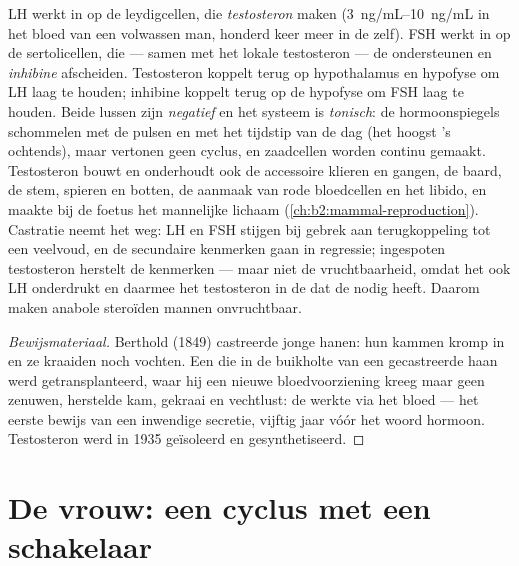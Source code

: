 \begin{proposition}\label{prop:b2:reproductive-hormones:testis}
LH werkt in op de leydigcellen, die \emph{testosteron} maken
(\qtyrange{3}{10}{ng/mL} in het bloed van een volwassen man, honderd keer
meer in de  zelf). FSH werkt in op de sertolicellen, die --- samen met
het lokale testosteron --- de  ondersteunen en
\emph{inhibine} afscheiden. Testosteron koppelt terug op hypothalamus en
hypofyse om LH laag te houden; inhibine koppelt terug op de hypofyse om FSH
laag te houden. Beide lussen zijn \emph{negatief} en het systeem is
\emph{tonisch}: de hormoonspiegels schommelen met de pulsen en met het
tijdstip van de dag (het hoogst 's ochtends), maar vertonen geen cyclus, en
zaadcellen worden continu gemaakt. Testosteron bouwt en onderhoudt ook de
accessoire klieren en gangen, de baard, de stem, spieren en botten, de
aanmaak van rode bloedcellen en het libido, en maakte bij de foetus het
mannelijke lichaam (\cref{ch:b2:mammal-reproduction}). Castratie neemt het
weg: LH en FSH stijgen bij gebrek aan terugkoppeling tot een veelvoud, en de
secundaire kenmerken gaan in regressie; ingespoten testosteron herstelt de
kenmerken --- maar niet de vruchtbaarheid, omdat het ook LH onderdrukt en
daarmee het testosteron in de  dat de  nodig heeft.
Daarom maken anabole steroïden mannen onvruchtbaar.
\end{proposition}
\begin{proof}[Bewijsmateriaal]
Berthold (1849) castreerde jonge hanen: hun kammen kromp in en ze kraaiden
noch vochten. Een  die in de buikholte van een gecastreerde haan werd
getransplanteerd, waar hij een nieuwe bloedvoorziening kreeg maar geen
zenuwen, herstelde kam, gekraai en vechtlust: de  werkte via het
bloed --- het eerste bewijs van een inwendige secretie, vijftig jaar vóór
het woord hormoon. Testosteron werd in 1935 geïsoleerd en gesynthetiseerd.
\end{proof}

\section{De vrouw: een cyclus met een schakelaar}

